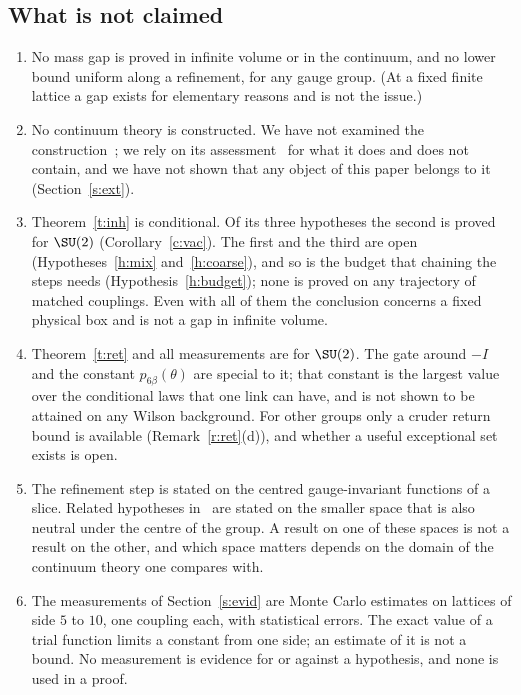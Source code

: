 \subsection{What is not claimed}\label{s:not}
\begin{enumerate}
\item No mass gap is proved in infinite volume or in the continuum, and no lower bound uniform along a
refinement, for any gauge group. (At a fixed finite lattice a gap exists for elementary reasons and is not
the issue.)
\item No continuum theory is constructed. We have not examined the construction~\cite{OAI}; we rely on its
assessment~\cite{YMG} for what it does and does not contain, and we have not shown that any object of this
paper belongs to it (Section~\ref{s:ext}).
\item Theorem~\ref{t:inh} is conditional. Of its three hypotheses the second is proved for $\SU(2)$
(Corollary~\ref{c:vac}). The first and the third are open (Hypotheses~\ref{h:mix} and~\ref{h:coarse}), and so
is the budget that chaining the steps needs (Hypothesis~\ref{h:budget}); none is proved on any trajectory of
matched couplings. Even with all of them the conclusion concerns a fixed physical box and is not a gap in
infinite volume.
\item Theorem~\ref{t:ret} and all measurements are for $\SU(2)$. The gate around $-I$ and the constant $p_{6\beta}(\theta)$
are special to it; that constant is the largest value over the conditional laws that one link can have, and
is not shown to be attained on any Wilson background. For other groups only a cruder return bound is available (Remark~\ref{r:ret}(d)), and
whether a useful exceptional set exists is open.
\item The refinement step is stated on the centred gauge-invariant functions of a slice. Related hypotheses
in~\cite{RepoInh} are stated on the smaller space that is also neutral under the centre of the group. A
result on one of these spaces is not a result on the other, and which space matters depends on the domain of
the continuum theory one compares with.
\item The measurements of Section~\ref{s:evid} are Monte Carlo estimates on lattices of side $5$ to $10$,
one coupling each, with statistical errors. The exact value of a trial function limits a constant from one
side; an estimate of it is not a bound. No measurement is evidence for or against a hypothesis, and none is
used in a proof.
\end{enumerate}

